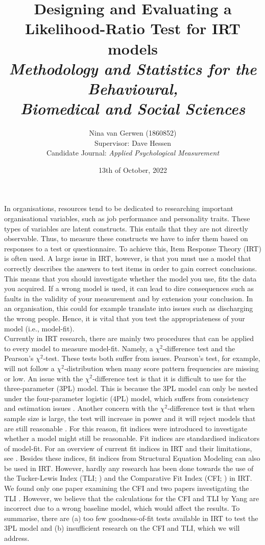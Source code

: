 \documentclass{article}
\title{%
	Designing and Evaluating a Likelihood-Ratio Test for IRT models \\
	\large \textit{Methodology and Statistics for the Behavioural, \\
	Biomedical and Social Sciences}}
\author{Nina van Gerwen (1860852) \\ 
	Supervisor: Dave Hessen \\ 
	\small {Candidate Journal: \textit{Applied Psychological Measurement}}}
\date{13th of October, 2022}
\begin{document}
\maketitle

\newpage

\section{}
\indent In organisations, resources tend to be dedicated to researching important organisational variables, such as job performance and personality traits. These types of variables are latent constructs. This entails that they are not directly observable. Thus, to measure these constructs we have to infer them based on responses to a test or questionnaire. To achieve this, Item Response Theory (IRT) is often used. A large issue in IRT, however, is that you must use a model that correctly describes the answers to test items in order to gain correct conclusions. This means that you should investigate whether the model you use, fits the data you acquired. If a wrong model is used, it can lead to dire consequences such as faults in the validity of your measurement \autocite{consq1, consq2, consq3} and by extension your conclusion. In an organisation, this could for example translate into issues such as discharging the wrong people. Hence, it is vital that you test the appropriateness of your model (i.e., model-fit). \\
\indent Currently in IRT research, there are mainly two procedures that can be applied to every model to measure model-fit. Namely, a $\chi^2$-difference test and the Pearson's $\chi^2$-test. These tests both suffer from issues. Pearson's test, for example, will not follow a $\chi^2$-distribution when many score pattern frequencies are missing or low. An issue with the $\chi^2$-difference test is that it is difficult to use for the three-parameter (3PL) model. This is because the 3PL model can only be nested under the four-parameter logistic (4PL) model, which suffers from consistency and estimation issues \autocite{4plconsist1, 4plconsist2}. Another concern with the $\chi^2$-difference test is that when sample size is large, the test will increase in power and it will reject models that are still reasonable \autocite{chi2sens}. For this reason, fit indices were introduced to investigate whether a model might still be reasonable. Fit indices are standardised indicators of model-fit. For an overview of current fit indices in IRT and their limitations, see \textcite{ref1}. Besides these indices, fit indices from Structural Equation Modeling can also be used in IRT. However, hardly any research has been done towards the use of the Tucker-Lewis Index (TLI; \cite{tli}) and the Comparative Fit Index (CFI; \cite{cfi}) in IRT. We found only one paper examining the CFI \autocite{yangfitindex} and two papers investigating the TLI \autocite{yangfitindex, tliirt}. However, we believe that the calculations for the CFI and TLI by Yang are incorrect due to a wrong baseline model, which would affect the results. To summarise, there are (a) too few goodness-of-fit tests available in IRT to test the 3PL model and (b) insufficient research on the CFI and TLI, which we will address. \\
\end{document}
